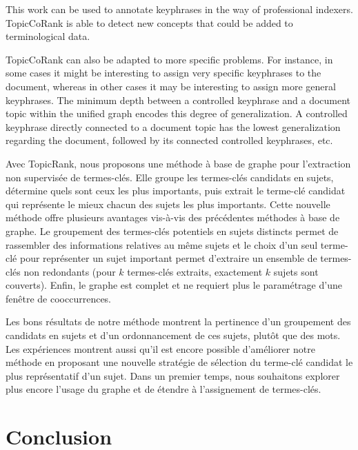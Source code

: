       This work can be used to annotate keyphrases in the way of professional
      indexers. TopicCoRank is able to detect new concepts that could be added
      to terminological data.
      
      TopicCoRank can also be adapted to more specific problems. For instance,
      in some cases it might be interesting to assign very specific keyphrases to the
      document, whereas in other cases it may be interesting to assign more general keyphrases. The
      minimum depth between a controlled keyphrase and a document topic within the unified graph encodes this
      degree of generalization. A controlled keyphrase directly connected to a
      document topic has the lowest generalization regarding the document,
      followed by its connected controlled keyphrases, etc.


      Avec TopicRank, nous proposons une méthode à base de graphe pour
      l'extraction non supervisée de termes-clés. Elle groupe les termes-clés
      candidats en sujets, détermine quels sont ceux les plus importants, puis
      extrait le terme-clé candidat qui représente le mieux chacun des sujets
      les plus importants. Cette nouvelle méthode offre plusieurs avantages
      vis-à-vis des précédentes méthodes à base de graphe. Le groupement des
      termes-clés potentiels en sujets distincts permet de rassembler des
      informations relatives au même sujets et le choix d'un seul terme-clé
      pour représenter un sujet important permet d'extraire un ensemble de
      termes-clés non redondants (pour $k$ termes-clés extraits, exactement
      $k$ sujets sont couverts). Enfin, le graphe est complet et ne requiert
      plus le paramétrage d'une fenêtre de cooccurrences.

      Les bons résultats de notre méthode montrent la pertinence d'un
      groupement des candidats en sujets et d'un ordonnancement de ces sujets,
      plutôt que des mots. Les expériences montrent aussi qu'il est encore
      possible d'améliorer notre méthode en proposant une nouvelle stratégie
      de sélection du terme-clé candidat le plus représentatif d'un sujet.
      Dans un premier temps, nous souhaitons explorer plus encore l'usage du
      graphe et de étendre à l'assignement de termes-clés.


  \section{Conclusion}
  \label{sec:main-automatic_keyphrase_annotation-conclusion}

